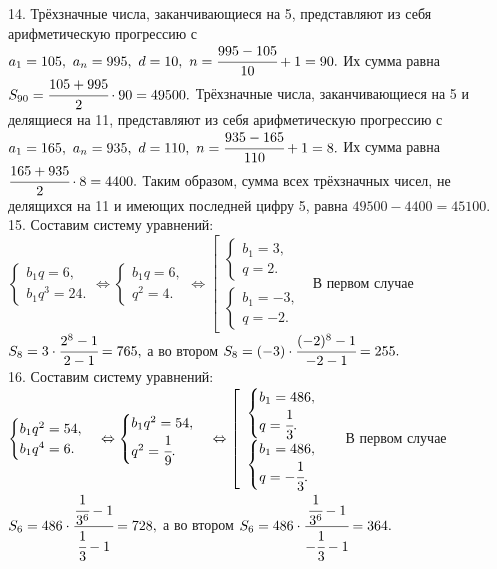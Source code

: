 \documentclass[12pt]{article}
\begin{document}
14. Трёхзначные числа, заканчивающиеся на 5, представляют из себя арифметическую прогрессию с $a_1=105,\ a_n=995,\ d=10,\ n=\cfrac{995-105}{10}+1=90.$ Их сумма равна $S_{90}=\cfrac{105+995}{2}\cdot90=49500.$ Трёхзначные числа, заканчивающиеся на 5 и делящиеся на 11, представляют из себя арифметическую прогрессию с $a_1=165,\ a_n=935,\ d=110,\ n=\cfrac{935-165}{110}+1=8.$ Их сумма равна $\cfrac{165+935}{2}\cdot8=4400.$ Таким образом, сумма всех трёхзначных чисел, не делящихся на 11 и имеющих последней цифру 5, равна $49500-4400=45100.$\\
15. Составим систему уравнений: $\begin{cases}b_1q=6,\\b_1q^3=24.\end{cases}\Leftrightarrow\begin{cases}b_1q=6,\\q^2=4.\end{cases}
\Leftrightarrow\left[\begin{array}{l}\begin{cases}b_1=3,\\q=2.\end{cases}\\ \begin{cases}b_1=-3,\\q=-2.\end{cases}\end{array}\right.$ В первом случае
$S_8=3\cdot\cfrac{2^8-1}{2-1}=765,$ а во втором $S_8=(-3)\cdot\cfrac{(-2)^8-1}{-2-1}=255.$\\
16. Составим систему уравнений: $\begin{cases}b_1q^2=54,\\b_1q^4=6.\end{cases}\Leftrightarrow\begin{cases}b_1q^2=54,\\q^2=\cfrac{1}{9}.\end{cases}
\Leftrightarrow\left[\begin{array}{l}\begin{cases}b_1=486,\\q=\cfrac{1}{3}.\end{cases}\\ \begin{cases}b_1=486,\\q=-\cfrac{1}{3}.\end{cases}\end{array}\right.$ В первом случае
$S_6=486\cdot\cfrac{\cfrac{1}{3^6}-1}{\cfrac{1}{3}-1}=728,$ а во втором $S_6=486\cdot\cfrac{\cfrac{1}{3^6}-1}{-\cfrac{1}{3}-1}=364.$\\
\end{document}
